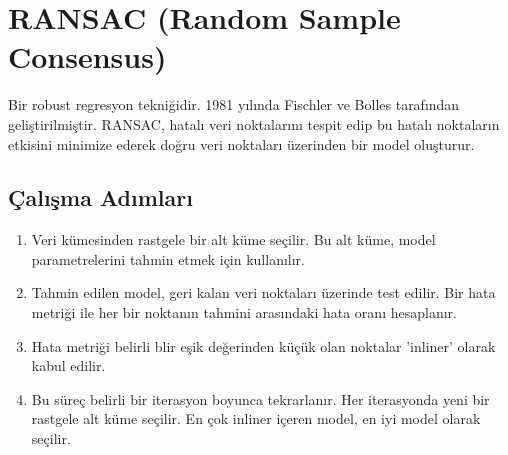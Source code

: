 \section{RANSAC (Random Sample Consensus)}
Bir robust regresyon tekniğidir. 1981 yılında Fischler ve Bolles tarafından geliştirilmiştir. RANSAC, hatalı veri noktalarını tespit edip bu hatalı noktaların etkisini minimize ederek doğru veri noktaları üzerinden bir model oluşturur. 

\subsection{Çalışma Adımları}
\begin{enumerate}
	\item Veri kümesinden rastgele bir alt küme seçilir. Bu alt küme, model parametrelerini tahmin etmek için kullanılır.
	\item Tahmin edilen model, geri kalan veri noktaları üzerinde test edilir. Bir hata metriği ile her bir noktanın tahmini arasındaki hata oranı hesaplanır.
	\item Hata metriği belirli blir eşik değerinden küçük olan noktalar 'inliner' olarak kabul edilir.
	\item Bu süreç belirli bir iterasyon boyunca tekrarlanır. Her iterasyonda yeni bir rastgele alt küme seçilir. En çok inliner içeren model, en iyi model olarak seçilir.
\end{enumerate}



\newpage